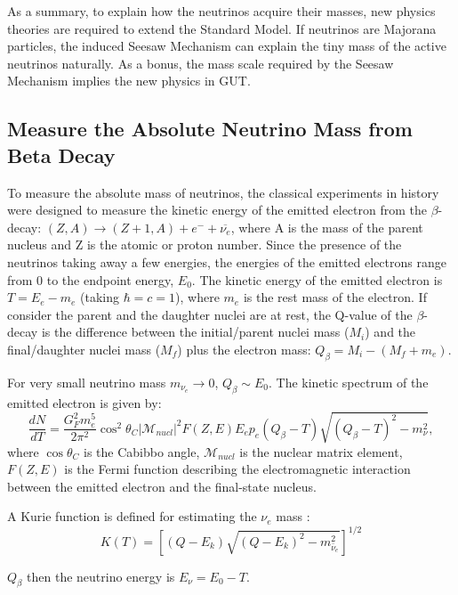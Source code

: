 As a summary, to explain how the neutrinos acquire their masses, new physics theories are required to extend the Standard Model. If neutrinos are Majorana particles, the induced Seesaw Mechanism can explain the tiny mass of the active neutrinos naturally. As a bonus, the mass scale required by the Seesaw Mechanism implies the new physics in GUT.

\subsection{Measure the Absolute Neutrino Mass from Beta Decay}
To measure the absolute mass of neutrinos, the classical experiments in history were designed to measure the kinetic energy of the emitted electron from the $\beta$-decay: $(Z,A)\to (Z+1,A)+e^-+\overline{\nu_e}$, where A is the mass of the parent nucleus and Z is the atomic or proton number. Since the presence of the neutrinos taking away a few energies, the energies of the emitted electrons range from 0 to the endpoint energy, $E_0$. The kinetic energy of the emitted electron is $T=E_e-m_e$ (taking $\hbar=c=1$), where $m_e$ is the rest mass of the electron. If consider the parent and the daughter nuclei are at rest, the Q-value of the $\beta$-decay is the difference between the initial/parent nuclei mass ($M_i$) and the final/daughter nuclei mass ($M_f$) plus the electron mass: $Q_\beta=M_i-(M_f+m_e)$. 



For very small neutrino mass $m_{\nu_e}\to 0$, $Q_\beta \sim E_0$. The kinetic spectrum of the emitted electron is given by\cite{giunti2007fundamentals}:
\begin{equation}\label{eq:beta-decay}
\frac{dN}{dT} = \frac{G_F^2 m_e^5}{2\pi^2}\cos^2\theta_C|\mathcal{M}_{nucl}|^2 F(Z,E)E_e p_e(Q_\beta-T)\sqrt{(Q_\beta-T)^2-m_\nu^2},
\end{equation}
where $\cos\theta_C$ is the Cabibbo angle, $\mathcal{M}_{nucl}$ is the nuclear matrix element, $F(Z,E)$ is the Fermi function describing the electromagnetic interaction between the emitted electron and the final-state nucleus.

A Kurie function is defined for estimating the $\nu_e$ mass \cite{giunti2007fundamentals}:
\begin{equation}
K(T) =\left[(Q-E_k)\sqrt{(Q-E_k)^2-m^2_{\bar{\nu}_e}}\right]^{1/2}
\end{equation}

$Q_\beta$ 
then the neutrino energy is $E_\nu=E_0-T$.

